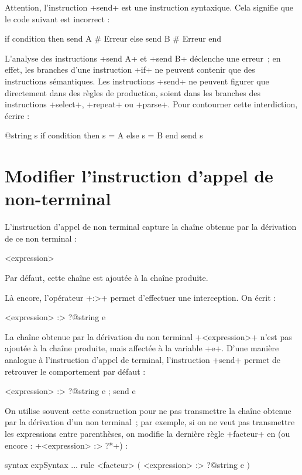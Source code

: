 Attention, l'instruction \ggsq+send+ est une instruction syntaxique. Cela signifie que le code suivant est incorrect :

\begin{galgas4}
if condition then
  send A # Erreur
else
  send B # Erreur
end
\end{galgas4}

L'analyse des instructions \ggsq+send A+ et  \ggsq+send B+ déclenche une erreur~; en effet, les branches d'une instruction \ggsq+if+ ne peuvent contenir que des instructions sémantiques. Les instructions \ggsq+send+ ne peuvent figurer que directement dans des règles de production, soient dans les branches des instructions \ggsq+select+, \ggsq+repeat+ ou \ggsq+parse+. Pour contourner cette interdiction, écrire :
\begin{galgas4}
@string s
if condition then
  s = A
else
  s = B
end
send s
\end{galgas4}



\section{Modifier l'instruction d'appel de non-terminal}

L'instruction d'appel de non terminal capture la chaîne obtenue par la dérivation de ce non terminal :
\begin{galgas4}
<expression>
\end{galgas4}


Par défaut, cette chaîne est ajoutée à la chaîne produite.

Là encore, l'opérateur \ggsq+:>+ permet d'effectuer une interception. On écrit :
\begin{galgas4}
<expression> :> ?@string e
\end{galgas4}

La chaîne obtenue par la dérivation du non terminal \ggsq+<expression>+ n'est pas ajoutée à la chaîne produite, mais affectée à la variable \ggsq+e+. D'une manière analogue à l'instruction d'appel de terminal, l'instruction \ggsq+send+ permet de retrouver le comportement par défaut :
\begin{galgas4}
<expression> :> ?@string e ; send e
\end{galgas4}

On utilise souvent cette construction pour ne pas transmettre la chaîne obtenue par la dérivation d'un non terminal~; par exemple, si on ne veut pas transmettre les expressions entre parenthèses, on modifie la dernière règle \ggsq+facteur+ en (ou encore : \ggsq+<expression> :> ?*+) :
\begin{galgas4}
syntax expSyntax {
  ...
  rule <facteur> {
    $($
    <expression> :> ?@string e
    $)$
  }
}
\end{galgas4}


